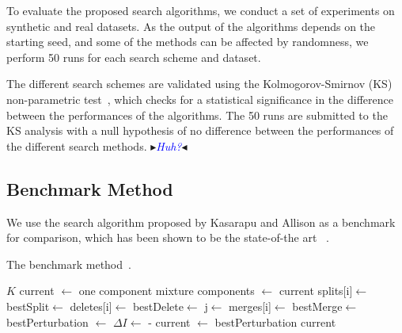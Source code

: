 \documentclass{elsarticle}
\newcommand{\nbb}[2]{
    \fcolorbox{black}{cyan}{\bfseries\sffamily\scriptsize#1}
    {\sf$\blacktriangleright$\textcolor{blue}{\textit{#2}}$\blacktriangleleft$}
}
\newcommand{\andy}[1]{\nbb{Andy}{#1}}
\begin{document}
To evaluate the proposed search algorithms, we conduct a set of experiments on synthetic and real datasets. As the output of the algorithms depends on the starting seed, and some of the methods can be affected by randomness, we perform 50 runs for each search scheme and dataset. 

The different search schemes are validated using the Kolmogorov-Smirnov (KS) non-parametric test~\citep{Pettitt77S}, which checks for a statistical significance in the difference between the performances of the algorithms. The 50 runs are submitted to the KS analysis with a null hypothesis of no difference between the performances of the different search methods.  \andy{Huh?}


\subsection{Benchmark Method}
We use the search algorithm proposed by Kasarapu and Allison as a benchmark for comparison, which
has been shown to be the state-of-the art
~\cite{kasarapu2015minimum}. 
\begin{algorithm}[H]
\caption{The benchmark method~\cite{kasarapu2015minimum}.}
\label{alg:kasarapu}
\begin{algorithmic}[1]
 $K$ 
\State current $\leftarrow$ one component mixture
\State components $\leftarrow$ current
  \label{line:splitBegin}
    \State splits[i]$\leftarrow$ 
  \EndFor
\State  bestSplit$\leftarrow$\label{line:splitEnd} 
  \label{line:deleteBegin}
    \State deletes[i]$\leftarrow$ 
  \EndFor
\State  bestDelete$\leftarrow$ \label{line:deleteEnd}
\EndIf
  \label{line:MergeBegin}
    \State j$\leftarrow$ 
    \State merges[i]$\leftarrow$ 
  \EndFor
\State  bestMerge$\leftarrow$ \label{line:MergeEnd}
\State bestPerturbation $\leftarrow$  
\State $\Delta I \leftarrow$ - 
\State current $\leftarrow$ bestPerturbation
\EndIf
{} \label{line:end}
\EndWhile
{} current
\end{algorithmic}
\end{algorithm}
\end{document}
